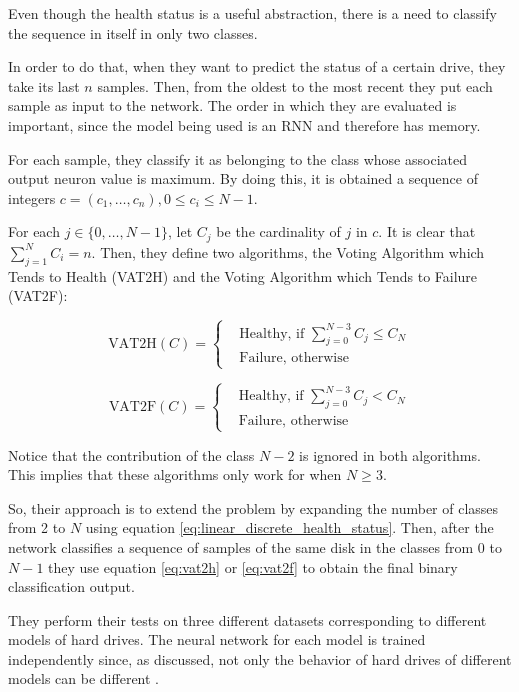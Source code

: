 Even though the health status is a useful abstraction, there is a need to classify the sequence in itself in only two classes.

In order to do that, when they want to predict the status of a certain drive, they take its last $n$ samples.
Then, from the oldest to the most recent they put each sample as input to the network.
The order in which they are evaluated is important, since the model being used is an RNN and therefore has memory.

For each sample, they classify it as belonging to the class whose associated output neuron value is maximum.
By doing this, it is obtained a sequence of integers $c = (c_1, \dots, c_n), 0 \leq c_i \leq N-1$.

For each $j \in \{0,\dots,N-1\}$, let $C_j$ be the cardinality of $j$ in $c$.
It is clear that $\sum_{j=1}^N C_i = n$.
Then, they define two algorithms, the Voting Algorithm which Tends to Health (VAT2H) and the Voting Algorithm which Tends to Failure (VAT2F):

\begin{equation}\label{eq:vat2h}
    \text{VAT2H}(C) = 
    \begin{cases}
        & \text{Healthy, if } \sum_{j=0}^{N-3}C_j \leq C_N \\
        & \text{Failure, otherwise}
    \end{cases}
\end{equation}

\begin{equation}\label{eq:vat2f}
    \text{VAT2F}(C) = 
    \begin{cases}
        & \text{Healthy, if } \sum_{j=0}^{N-3}C_j < C_N \\
        & \text{Failure, otherwise}
    \end{cases}
\end{equation}

Notice that the contribution of the class $N-2$ is ignored in both algorithms.
This implies that these algorithms only work for when $N \geq 3$.

So, their approach is to extend the problem by expanding the number of classes from 2 to $N$ using equation \ref{eq:linear_discrete_health_status}.
Then, after the network classifies a sequence of samples of the same disk in the classes from 0 to $N-1$ they use equation \ref{eq:vat2h} or \ref{eq:vat2f} to obtain the final binary classification output.

They perform their tests on three different datasets corresponding to different models of hard drives.
The neural network for each model is trained independently since, as discussed, not only the behavior of hard drives of different models can be different \cite{Xu16}.

